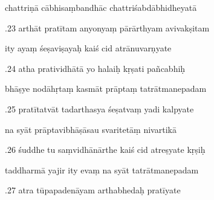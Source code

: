 \documentclass[article,12pt,a4paper]{memoir}%
\newcounter{parCount}
\begin{document}
	  
	  \pstart \leavevmode%
	chattriṇā cābhisaṃbandhāc chattriśabdābhidheyatā 
	{}
	\pend%
      

	  
	  \pstart {}.23 arthāt pratītam anyonyaṃ pārārthyam avivakṣitam 
	{}
	\pend%
      

	  
	  \pstart \leavevmode%
	ity ayaṃ śeṣaviṣayaḥ kaiś cid atrānuvarṇyate 
	{}
	\pend%
      

	  
	  \pstart {}.24 atha pratividhātā yo halaiḥ kṛṣati pañcabhiḥ 
	{}
	\pend%
      

	  
	  \pstart \leavevmode%
	bhāṣye nodāhṛtaṃ kasmāt prāptaṃ tatrātmanepadam 
	{}
	\pend%
      

	  
	  \pstart {}.25 pratītatvāt tadarthasya śeṣatvaṃ yadi kalpyate 
	{}
	\pend%
      

	  
	  \pstart \leavevmode%
	na syāt prāptavibhāṣāsau svaritetāṃ nivartikā 
	{}
	\pend%
      

	  
	  \pstart {}.26 śuddhe tu saṃvidhānārthe kaiś cid atreṣyate kṛṣiḥ 
	{}
	\pend%
      

	  
	  \pstart \leavevmode%
	taddharmā yajir ity evaṃ na syāt tatrātmanepadam 
	{}
	\pend%
      

	  
	  \pstart {}.27 atra tūpapadenāyam arthabhedaḥ pratīyate 
	{}
	\pend%
      
\end{document}
